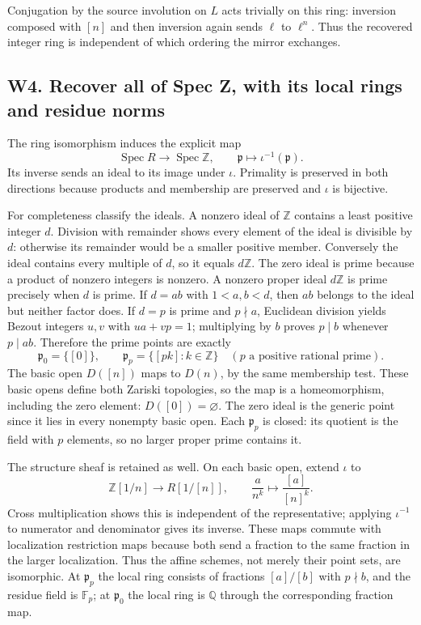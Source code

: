 \documentclass[
  11pt,
]{article}
\begin{document}
Conjugation by the source involution on \(L\) acts trivially on this
ring: inversion composed with \([n]\) and then inversion again sends
\(\ell\) to \(\ell^n\). Thus the recovered integer ring is independent
of which ordering the mirror exchanges.

\subsection{W4. Recover all of Spec Z, with its local rings and residue
norms}\label{w4.-recover-all-of-spec-z-with-its-local-rings-and-residue-norms}

The ring isomorphism induces the explicit map \[
\operatorname{Spec}R\longrightarrow\operatorname{Spec}\mathbb Z,
\qquad \mathfrak p\longmapsto\iota^{-1}(\mathfrak p).
\] Its inverse sends an ideal to its image under \(\iota\). Primality is
preserved in both directions because products and membership are
preserved and \(\iota\) is bijective.

For completeness classify the ideals. A nonzero ideal of \(\mathbb Z\)
contains a least positive integer \(d\). Division with remainder shows
every element of the ideal is divisible by \(d\): otherwise its
remainder would be a smaller positive member. Conversely the ideal
contains every multiple of \(d\), so it equals \(d\mathbb Z\). The zero
ideal is prime because a product of nonzero integers is nonzero. A
nonzero proper ideal \(d\mathbb Z\) is prime precisely when \(d\) is
prime. If \(d=ab\) with \(1<a,b<d\), then \(ab\) belongs to the ideal
but neither factor does. If \(d=p\) is prime and \(p\nmid a\), Euclidean
division yields Bezout integers \(u,v\) with \(ua+vp=1\); multiplying by
\(b\) proves \(p\mid b\) whenever \(p\mid ab\). Therefore the prime
points are exactly \[
\mathfrak p_0=\{[0]\},\qquad
\mathfrak p_p=\{[pk]:k\in\mathbb Z\}\quad(p\text{ a positive rational prime}).
\] The basic open \(D([n])\) maps to \(D(n)\), by the same membership
test. These basic opens define both Zariski topologies, so the map is a
homeomorphism, including the zero element: \(D([0])=\varnothing\). The
zero ideal is the generic point since it lies in every nonempty basic
open. Each \(\mathfrak p_p\) is closed: its quotient is the field with
\(p\) elements, so no larger proper prime contains it.

The structure sheaf is retained as well. On each basic open, extend
\(\iota\) to \[
\mathbb Z[1/n]\longrightarrow R[1/[n]],\qquad
\frac{a}{n^k}\longmapsto\frac{[a]}{[n]^k}.
\] Cross multiplication shows this is independent of the representative;
applying \(\iota^{-1}\) to numerator and denominator gives its inverse.
These maps commute with localization restriction maps because both send
a fraction to the same fraction in the larger localization. Thus the
affine schemes, not merely their point sets, are isomorphic. At
\(\mathfrak p_p\) the local ring consists of fractions \([a]/[b]\) with
\(p\nmid b\), and the residue field is \(\mathbb F_p\); at
\(\mathfrak p_0\) the local ring is \(\mathbb Q\) through the
corresponding fraction map.
\end{document}
